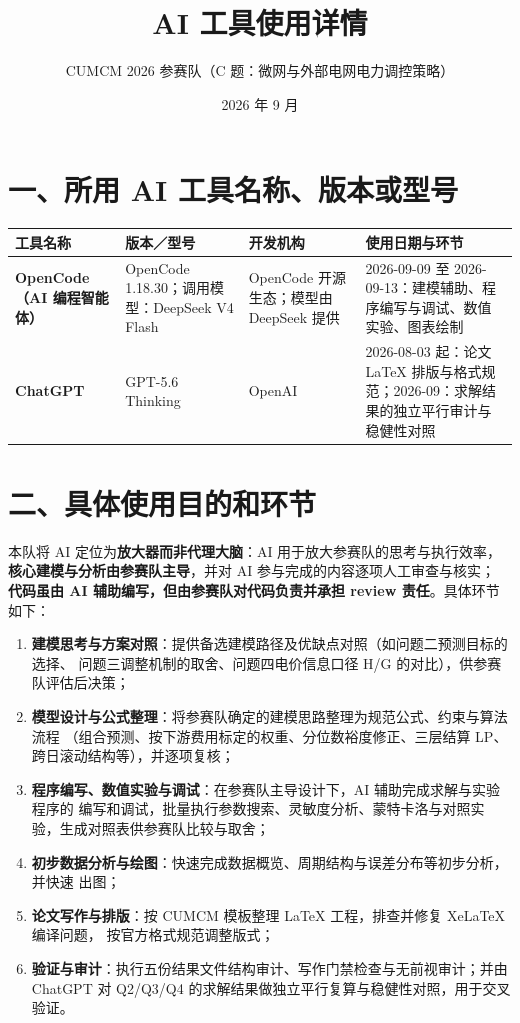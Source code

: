 \documentclass[a4paper,11pt]{ctexart}
\title{AI 工具使用详情}
\author{CUMCM 2026 参赛队（C 题：微网与外部电网电力调控策略）}
\date{2026 年 9 月}
\begin{document}
\maketitle

\section*{一、所用 AI 工具名称、版本或型号}
\begin{tabularx}{\textwidth}{>{\bfseries}p{} p{} p{} X}
\toprule
工具名称 & 版本／型号 & 开发机构 & 使用日期与环节 \\
\midrule
OpenCode（AI 编程智能体） & OpenCode 1.18.30；调用模型：DeepSeek V4 Flash & OpenCode 开源生态；模型由 DeepSeek 提供 & 2026-09-09 至 2026-09-13：建模辅助、程序编写与调试、数值实验、图表绘制 \\
ChatGPT & GPT-5.6 Thinking & OpenAI & 2026-08-03 起：论文 LaTeX 排版与格式规范；2026-09：求解结果的独立平行审计与稳健性对照 \\
\bottomrule
\end{tabularx}

\section*{二、具体使用目的和环节}
本队将 AI 定位为\textbf{放大器而非代理大脑}：AI 用于放大参赛队的思考与执行效率，
\textbf{核心建模与分析由参赛队主导}，并对 AI 参与完成的内容逐项人工审查与核实；
\textbf{代码虽由 AI 辅助编写，但由参赛队对代码负责并承担 review 责任}。具体环节如下：

\begin{enumerate}[leftmargin=2.5em,itemsep=2pt]
\item \textbf{建模思考与方案对照}：提供备选建模路径及优缺点对照（如问题二预测目标的选择、
问题三调整机制的取舍、问题四电价信息口径 H/G 的对比），供参赛队评估后决策；
\item \textbf{模型设计与公式整理}：将参赛队确定的建模思路整理为规范公式、约束与算法流程
（组合预测、按下游费用标定的权重、分位数裕度修正、三层结算 LP、跨日滚动结构等），并逐项复核；
\item \textbf{程序编写、数值实验与调试}：在参赛队主导设计下，AI 辅助完成求解与实验程序的
编写和调试，批量执行参数搜索、灵敏度分析、蒙特卡洛与对照实验，生成对照表供参赛队比较与取舍；
\item \textbf{初步数据分析与绘图}：快速完成数据概览、周期结构与误差分布等初步分析，并快速
出图；
\item \textbf{论文写作与排版}：按 CUMCM 模板整理 LaTeX 工程，排查并修复 XeLaTeX 编译问题，
按官方格式规范调整版式；
\item \textbf{验证与审计}：执行五份结果文件结构审计、写作门禁检查与无前视审计；并由 ChatGPT
对 Q2/Q3/Q4 的求解结果做独立平行复算与稳健性对照，用于交叉验证。
\end{enumerate}
\end{document}
